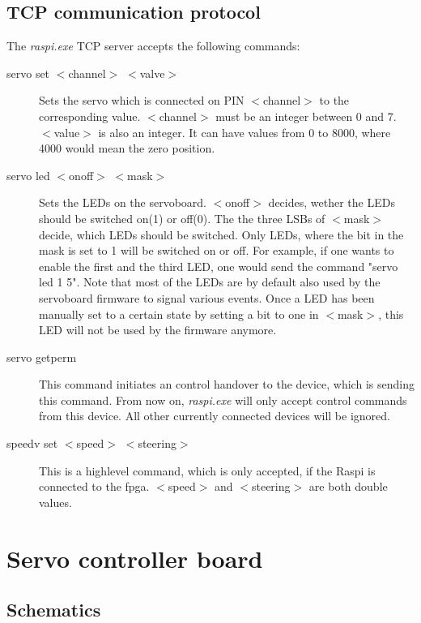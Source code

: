 \documentclass[12pt]{article}
\begin{document}
\subsection{TCP communication protocol}
The \textit{raspi.exe} TCP server accepts the following commands:
\begin{description}
\item[servo set $<$channel$>$ $<$valve$>$] Sets the servo which is connected on PIN $<$channel$>$ to the corresponding value. $<$channel$>$ must be an integer between 0 and 7. $<$value$>$ is also an integer. It can have values from 0 to 8000, where 4000 would mean the zero position.
\item[servo led $<$onoff$>$ $<$mask$>$] Sets the LEDs on the servoboard. $<$onoff$>$ decides, wether the LEDs should be switched on(1) or off(0). The the three LSBs of $<$mask$>$ decide, which LEDs should be switched. Only LEDs, where the bit in the mask is set to 1 will be switched on or off. For example, if one wants to enable the first and the third LED, one would send the command "servo led 1 5". Note that most of the LEDs are by default also used by the servoboard firmware to signal various events. Once a LED has been manually set to a certain state by setting a bit to one in $<$mask$>$, this LED will not be used by the firmware anymore.
\item[servo getperm] This command initiates an control handover to the device, which is sending this command. From now on, \textit{raspi.exe} will only accept control commands from this device. All other currently connected devices will be ignored.
\item[speedv set $<$speed$>$ $<$steering$>$] This is a highlevel command, which is only accepted, if the Raspi is connected to the fpga. $<$speed$>$ and $<$steering$>$ are both double values.
\end{description}

\section{Servo controller board}

\subsection{Schematics}
\end{document}
